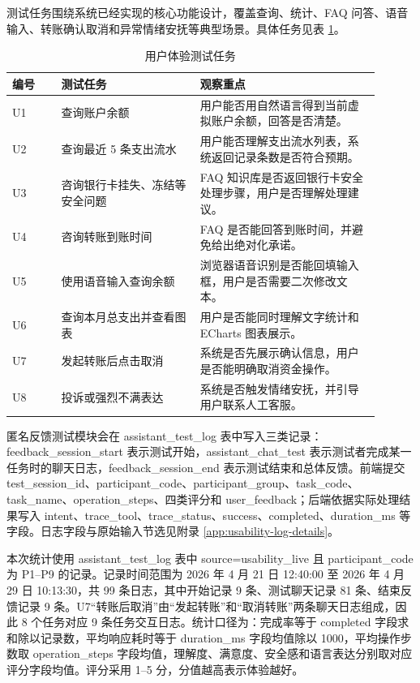 \documentclass[bachelor, print]{xduthesis}
\begin{document}
测试任务围绕系统已经实现的核心功能设计，覆盖查询、统计、FAQ 问答、语音输入、转账确认取消和异常情绪安抚等典型场景。具体任务见表 \ref{tab:user-experience-task}。

\begin{table}[H]
    \centering
    \caption{用户体验测试任务}
    \label{tab:user-experience-task}
    \small
    \setlength{\tabcolsep}{4pt}
    \begin{tabular}{|p{0.12\linewidth}|p{0.34\linewidth}|p{0.44\linewidth}|}
        \hline
        编号 & 测试任务 & 观察重点 \\
        \hline
        U1 & 查询账户余额 & 用户能否用自然语言得到当前虚拟账户余额，回答是否清楚。 \\
        \hline
        U2 & 查询最近 5 条支出流水 & 用户能否理解支出流水列表，系统返回记录条数是否符合预期。 \\
        \hline
        U3 & 咨询银行卡挂失、冻结等安全问题 & FAQ 知识库是否返回银行卡安全处理步骤，用户是否理解处理建议。 \\
        \hline
        U4 & 咨询转账到账时间 & FAQ 是否能回答到账时间，并避免给出绝对化承诺。 \\
        \hline
        U5 & 使用语音输入查询余额 & 浏览器语音识别是否能回填输入框，用户是否需要二次修改文本。 \\
        \hline
        U6 & 查询本月总支出并查看图表 & 用户是否能同时理解文字统计和 ECharts 图表展示。 \\
        \hline
        U7 & 发起转账后点击取消 & 系统是否先展示确认信息，用户是否能明确取消资金操作。 \\
        \hline
        U8 & 投诉或强烈不满表达 & 系统是否触发情绪安抚，并引导用户联系人工客服。 \\
        \hline
    \end{tabular}
\end{table}

匿名反馈测试模块会在 assistant\_test\_log 表中写入三类记录：feedback\_session\_start 表示测试开始，assistant\_chat\_test 表示测试者完成某一任务时的聊天日志，feedback\_session\_end 表示测试结束和总体反馈。前端提交 test\_session\_id、participant\_code、participant\_group、task\_code、task\_name、operation\_steps、四类评分和 user\_feedback；后端依据实际处理结果写入 intent、trace\_tool、trace\_status、success、completed、duration\_ms 等字段。日志字段与原始输入节选见附录 \ref{app:usability-log-details}。

本次统计使用 assistant\_test\_log 表中 source=usability\_live 且 participant\_code 为 P1--P9 的记录。记录时间范围为 2026 年 4 月 21 日 12:40:00 至 2026 年 4 月 29 日 10:13:30，共 99 条日志，其中开始记录 9 条、测试聊天记录 81 条、结束反馈记录 9 条。U7“转账后取消”由“发起转账”和“取消转账”两条聊天日志组成，因此 8 个任务对应 9 条任务交互日志。统计口径为：完成率等于 completed 字段求和除以记录数，平均响应耗时等于 duration\_ms 字段均值除以 1000，平均操作步数取 operation\_steps 字段均值，理解度、满意度、安全感和语言表达分别取对应评分字段均值。评分采用 1--5 分，分值越高表示体验越好。
\end{document}
